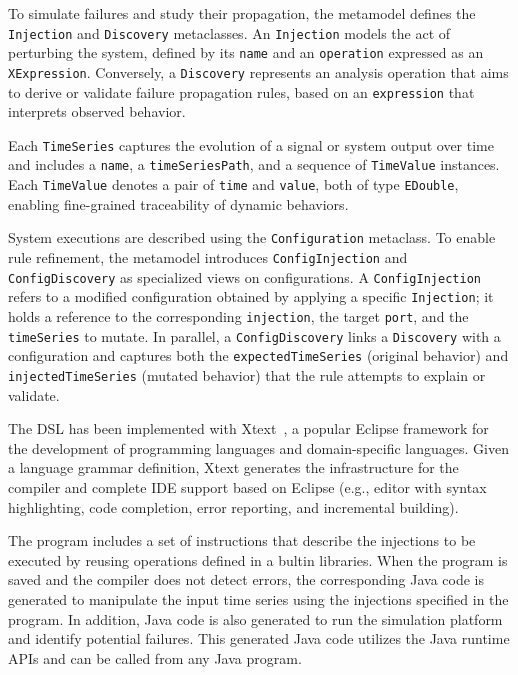 To simulate failures and study their propagation, the metamodel defines the \texttt{Injection} and \texttt{Discovery} metaclasses. An \texttt{Injection} models the act of perturbing the system, defined by its \texttt{name} and an \texttt{operation} expressed as an \texttt{XExpression}. Conversely, a \texttt{Discovery} represents an analysis operation that aims to derive or validate failure propagation rules, based on an \texttt{expression} that interprets observed behavior.

Each \texttt{TimeSeries} captures the evolution of a signal or system output over time and includes a \texttt{name}, a \texttt{timeSeriesPath}, and a sequence of \texttt{TimeValue} instances. Each \texttt{TimeValue} denotes a pair of \texttt{time} and \texttt{value}, both of type \texttt{EDouble}, enabling fine-grained traceability of dynamic behaviors.

System executions are described using the \texttt{Configuration} metaclass. To enable rule refinement, the metamodel introduces \texttt{ConfigInjection} and \texttt{Config\-Discovery} as specialized views on configurations. A \texttt{ConfigInjection} refers to a modified configuration obtained by applying a specific \texttt{Injection}; it holds a reference to the corresponding \texttt{injection}, the target \texttt{port}, and the \texttt{timeSeries} to mutate. In parallel, a \texttt{ConfigDiscovery} links a \texttt{Discovery} with a configuration and captures both the \texttt{expectedTimeSeries} (original behavior) and \texttt{injectedTimeSeries} (mutated behavior) that the rule attempts to explain or validate.

The \tool DSL has been implemented with Xtext~\citep{10.5555/3074444}, a popular Eclipse framework for the development of programming languages and domain-specific languages. Given a language grammar definition, Xtext generates the infrastructure for the compiler and complete IDE support based on Eclipse (e.g., editor with syntax highlighting, code completion, error reporting, and incremental building).

The \tool program includes a set of instructions that describe the injections to be executed by reusing operations defined in a bultin libraries. When the \tool program is saved and the compiler does not detect errors, the corresponding Java code is generated to manipulate the input time series using the injections specified in the \tool program. In addition, Java code is also generated to run the simulation platform and identify potential failures. This generated Java code utilizes the \tool Java runtime APIs and can be called from any Java program.

